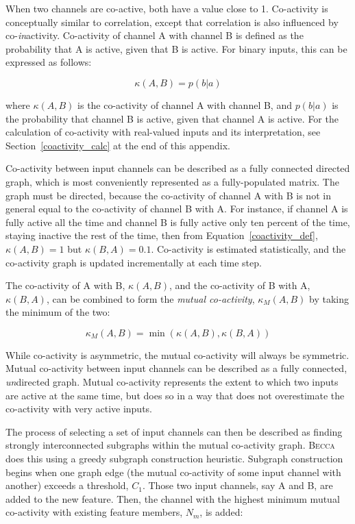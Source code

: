 When two channels are co-active, both have a value close to 1. Co-activity is conceptually similar to correlation, except that correlation is also influenced by co-{\em in}activity. Co-activity of channel A with channel B is defined as the probability that A is active, given that B is active. For binary inputs, this can be expressed as follows:

\begin{equation}
\kappa(A,B) = p(b|a)
\label{coactivity_def}
\end{equation}

where $\kappa(A,B)$ is the co-activity of channel A with channel B, and $p(b|a)$ is the probability that channel B is active, given that channel A is active. For the calculation of co-activity with real-valued inputs and its interpretation, see Section~\ref{coactivity_calc} at the end of this appendix. 

Co-activity between input channels can be described as a fully connected directed graph, which is most conveniently represented as a fully-populated matrix. The graph must be directed, because the co-activity of channel A with B is not in general equal to the co-activity of channel B with A. For instance, if channel A is fully active all the time and channel B is fully active only ten percent of the time, staying inactive the rest of the time, then from Equation~\ref{coactivity_def}, $\kappa(A,B) = 1$ but $\kappa(B,A) = 0.1$. Co-activity is estimated statistically, and the co-activity graph is updated incrementally at each time step. 

The co-activity of A with B,  $\kappa(A,B) $,  and the co-activity of B with A, $\kappa(B,A) $, can be combined to form the {\em mutual co-activity},  $\kappa_M(A,B) $ by taking the minimum of the two:

\begin{equation}
\kappa_M(A,B)   = \min(\kappa(A,B), \kappa(B,A)) 
\end{equation}

While co-activity is asymmetric, the mutual co-activity will always be symmetric. Mutual co-activity between input channels can be described as a fully connected, {\em un}directed graph. Mutual co-activity represents the extent to which two inputs are active at the same time, but does so in a way that does not overestimate the co-activity with very active inputs.

The process of selecting a set of input channels can then be described as finding strongly interconnected subgraphs within the mutual co-activity graph. \textsc{Becca} does this using a greedy subgraph construction heuristic. Subgraph construction begins when one graph edge (the mutual co-activity of some input channel with another) exceeds a threshold, $C_1$. Those two input channels, say A and B, are added to the new feature. Then, the channel with the highest minimum mutual co-activity with existing feature members, $N_m$, is added:

